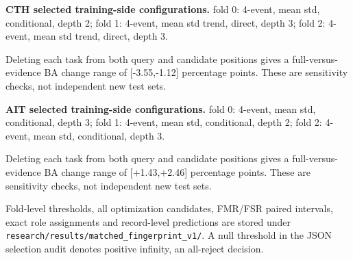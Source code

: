 \noindent\textbf{CTH selected training-side configurations.} fold 0: 4-event, mean std, conditional, depth 2; fold 1: 4-event, mean std trend, direct, depth 3; fold 2: 4-event, mean std trend, direct, depth 3.

Deleting each task from both query and candidate positions gives a full-versus-evidence BA change range of [-3.55,-1.12] percentage points. These are sensitivity checks, not independent new test sets.

\noindent\textbf{AIT selected training-side configurations.} fold 0: 4-event, mean std, conditional, depth 3; fold 1: 4-event, mean std, conditional, depth 2; fold 2: 4-event, mean std, conditional, depth 3.

Deleting each task from both query and candidate positions gives a full-versus-evidence BA change range of [+1.43,+2.46] percentage points. These are sensitivity checks, not independent new test sets.

Fold-level thresholds, all optimization candidates, FMR/FSR paired intervals, exact role assignments and record-level predictions are stored under \texttt{research/results/matched\_fingerprint\_v1/}. A null threshold in the JSON selection audit denotes positive infinity, an all-reject decision.
